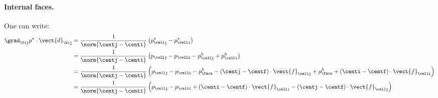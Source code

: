 \paragraph{Internal faces.} One can write:
\begin{align*}
        \grad_{\fij}{p^\star}\cdot\vect{d}_{\bij}
        &=\frac{1}{\norm{\centj-\centi}}\left(p_{\cellj}^\star-p_{\celli}^\star\right) \\
        &=\frac{1}{\norm{\centj-\centi}}\left(p_{\cellj}-p_{\celli}-p_{\cellj}^{h}+p_{\celli}^{h}\right) \\
        &=\frac{1}{\norm{\centj-\centi}}\left(p_{\cellj}-p_{\celli}-p_{\face}^{h}-\left(\centj-\centf\right)\cdot\vect{f}_{\cellj}+p_{\face}^{h}+\left(\centi-\centf\right)\cdot\vect{f}_{\celli}\right) \\
        &=\frac{1}{\norm{\centj-\centi}}\left(p_{\cellj}-p_{\celli}+\left(\centi-\centf\right)\cdot\vect{f}_{\celli}-\left(\centj-\centf\right)\cdot\vect{f}_{\cellj}\right)
\end{align*}

